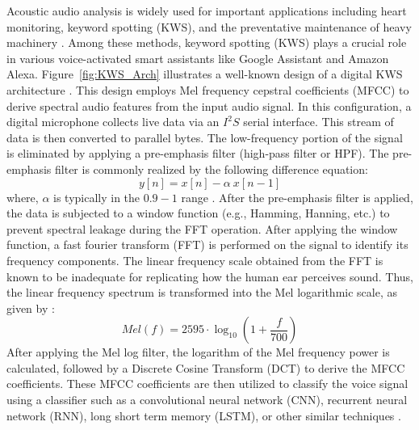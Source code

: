 Acoustic audio analysis is widely used for important applications including heart monitoring, keyword spotting (KWS), and the preventative maintenance of heavy machinery \cite{chong20220}. 
Among these methods, keyword spotting (KWS) plays a crucial role in various voice-activated smart assistants like Google Assistant and Amazon Alexa.
Figure~\ref{fig:KWS_Arch} illustrates a well-known design of a digital KWS architecture \cite{chong20220}. This design employs Mel frequency cepstral coefficients (MFCC) to derive spectral audio features from the input audio signal.
In this configuration, a digital microphone collects live data via an $I^2S$ serial interface. This stream of data is then converted to parallel bytes. The low-frequency portion of the signal is eliminated by applying a pre-emphasis filter (high-pass filter or HPF). The pre-emphasis filter is commonly realized by the following difference equation:
\begin{equation}
    y[n] = x[n] - \alpha~x[n-1] \label{eq:hpf}
\end{equation}
where, $\alpha$ is typically in the $0.9-1$ range \cite{han2006efficient}.  
After the pre-emphasis filter is applied, the data is subjected to a window function (e.g., Hamming, Hanning, etc.) to prevent spectral leakage during the FFT operation.
After applying the window function, a fast fourier transform (FFT) is performed on the signal to identify its frequency components. The linear frequency scale obtained from the FFT is known to be inadequate for replicating how the human ear perceives sound. Thus, the linear frequency spectrum is transformed into the Mel logarithmic scale, as given by \cite{han2006efficient}:
\begin{equation}
    Mel(f) = 2595\cdot \log_{10}\left({1 + \frac{f}{700}}\right) \label{eq:mel-log}
\end{equation}
After applying the Mel log filter, the logarithm of the Mel frequency power is calculated, followed by a Discrete Cosine Transform (DCT) to derive the MFCC coefficients. These MFCC coefficients are then utilized to classify the voice signal using a classifier such as a convolutional neural network (CNN), recurrent neural network (RNN), long short term memory (LSTM), or other similar techniques \cite{mahmood2021speech}.


